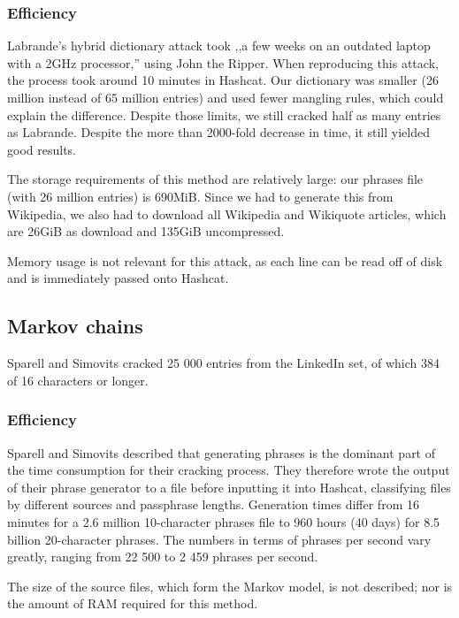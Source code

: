 \documentclass{article}
\begin{document}
\subsubsection{Efficiency}

Labrande's hybrid dictionary attack took ,,a few weeks on an outdated laptop
with a 2GHz processor,'' using John the Ripper. When reproducing this attack,
the process took around 10 minutes in Hashcat. Our dictionary was smaller (26
million instead of 65 million entries) and used fewer mangling rules, which
could explain the difference. Despite those limits, we still cracked half as
many entries as Labrande. Despite the more than 2000-fold decrease in time, it
still yielded good results.

The storage requirements of this method are relatively large: our phrases
file (with 26 million entries) is 690MiB. Since we had to generate this from
Wikipedia, we also had to download all Wikipedia and Wikiquote articles, which
are 26GiB as download and 135GiB uncompressed.

Memory usage is not relevant for this attack, as each line can be read off of
disk and is immediately passed onto Hashcat.


\subsection{Markov chains}

Sparell and Simovits cracked 25 000 entries from the LinkedIn set, of which 384
of 16 characters or longer.

\subsubsection{Efficiency}

Sparell and Simovits described that generating phrases is the dominant part of
the time consumption for their cracking process. They therefore wrote the
output of their phrase generator to a file before inputting it into Hashcat,
classifying files by different sources and passphrase lengths. Generation times
differ from 16 minutes for a 2.6 million 10-character phrases file to 960 hours
(40 days) for 8.5 billion 20-character phrases. The numbers in terms of phrases
per second vary greatly, ranging from 22 500 to 2 459 phrases per second.

The size of the source files, which form the Markov model, is not described;
nor is the amount of RAM required for this method.
\end{document}
